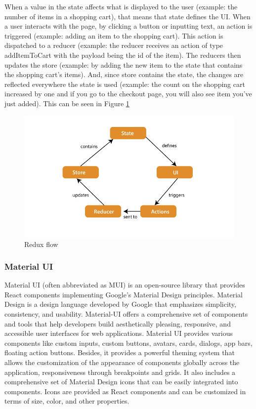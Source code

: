 \par When a value in the state affects what is displayed to the user (example: the number of items in a shopping cart), that means that state defines the UI. When a user interacts with the page, by clicking a button or inputting text, an action is triggered (example: adding an item to the shopping cart). This action is dispatched to a reducer (example: the reducer receives an action of type addItemToCart with the payload being the id of the item). The reducers then updates the store (example: by adding the new item to the state that contains the shopping cart's items). And, since store contains the state, the changes are reflected everywhere the state is used (example: the count on the shopping cart increased by one and if you go to the checkout page, you will also see item you've just added). This can be seen in Figure \ref{fig:redux-flow}

\begin{figure}[!ht]
    \centering
    \includegraphics[width=1\linewidth]{redux-flow.png}
    \caption{Redux flow \cite{reduxFlow}}
    \label{fig:redux-flow}
\end{figure}

\subsubsection{Material UI}

\par Material UI (often abbreviated as MUI) is an open-source library that provides React components implementing Google's Material Design principles. Material Design is a design language developed by Google that emphasizes simplicity, consistency, and usability. Material-UI offers a comprehensive set of components and tools that help developers build aesthetically pleasing, responsive, and accessible user interfaces for web applications. Material UI provides various components like custom inputs, custom buttons, avatars, cards, dialogs, app bars, floating action buttons. Besides, it provides a powerful theming system that allows the customization of the appearance of components globally across the application, responsiveness through breakpoints and grids. It also includes a comprehensive set of Material Design icons that can be easily integrated into components. Icons are provided as React components and can be customized in terms of size, color, and other properties.

